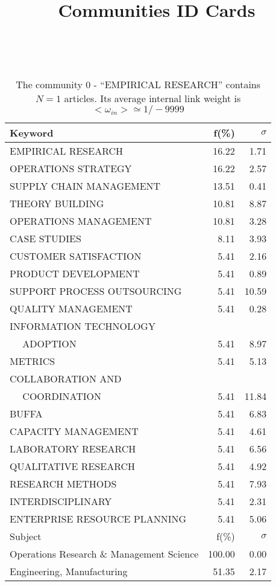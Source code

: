 \documentclass[a4paper,11pt]{report}
\title{{\bf Communities ID Cards}}
\date{\begin{flushleft}This document gather the ``ID Cards'' of the CC communities found within your database.\\
 The CC network was built by keeping a link between articles sharing at least 10 references. The communities characterized here correspond to the ones found in the level 0 (in the sense of the Louvain algo) which gathers more than 0 articles.\\
 These ID cards displays the most frequent keywords, subject categories, journals of publication, institution, countries, authors, references and reference journals of the articles of each community. The significance of an item $\sigma = \sqrt{N} (f - p) / \sqrt{p(1-p)}$ [where $N$ is the number of articles within the community and $f$ and $p$ are the proportion of articles respectively within the community and within the database displaying that item ] is also given (for example $\sigma > 5$ is really highly significant).\\
\vspace{1cm}
\copyright Sebastian Grauwin, Liu Weizhi - (2014) \end{flushleft}}
\begin{document}
\begin{landscape}
\maketitle
\clearpage

\begin{table}[!ht]
\caption{The community 0 - ``EMPIRICAL RESEARCH'' contains $N = 1$ articles. Its average internal link weight is $<\omega_{in}> \simeq 1/-9999$ }
\textcolor{white}{aa}\\
{\scriptsize\begin{tabular}{|l r r|}
\hline
Keyword & f(\%) & $\sigma$\\
\hline
EMPIRICAL RESEARCH & 16.22 & 1.71\\
OPERATIONS STRATEGY & 16.22 & 2.57\\
SUPPLY CHAIN MANAGEMENT & 13.51 & 0.41\\
THEORY BUILDING & 10.81 & 8.87\\
OPERATIONS MANAGEMENT & 10.81 & 3.28\\
CASE STUDIES & 8.11 & 3.93\\
CUSTOMER SATISFACTION & 5.41 & 2.16\\
PRODUCT DEVELOPMENT & 5.41 & 0.89\\
SUPPORT PROCESS OUTSOURCING & 5.41 & 10.59\\
QUALITY MANAGEMENT & 5.41 & 0.28\\
INFORMATION TECHNOLOGY &  & \\
$\quad$ ADOPTION & 5.41 & 8.97\\
METRICS & 5.41 & 5.13\\
COLLABORATION AND &  & \\
$\quad$ COORDINATION & 5.41 & 11.84\\
BUFFA & 5.41 & 6.83\\
CAPACITY MANAGEMENT & 5.41 & 4.61\\
LABORATORY RESEARCH & 5.41 & 6.56\\
QUALITATIVE RESEARCH & 5.41 & 4.92\\
RESEARCH METHODS & 5.41 & 7.93\\
INTERDISCIPLINARY & 5.41 & 2.31\\
ENTERPRISE RESOURCE PLANNING & 5.41 & 5.06\\
\hline
\hline
Subject & f(\%) & $\sigma$\\
\hline
Operations Research \& Management Science & 100.00 & 0.00\\
Engineering, Manufacturing & 51.35 & 2.17\\

\end{tabular}}
\end{table}
\end{landscape}
\end{document}
